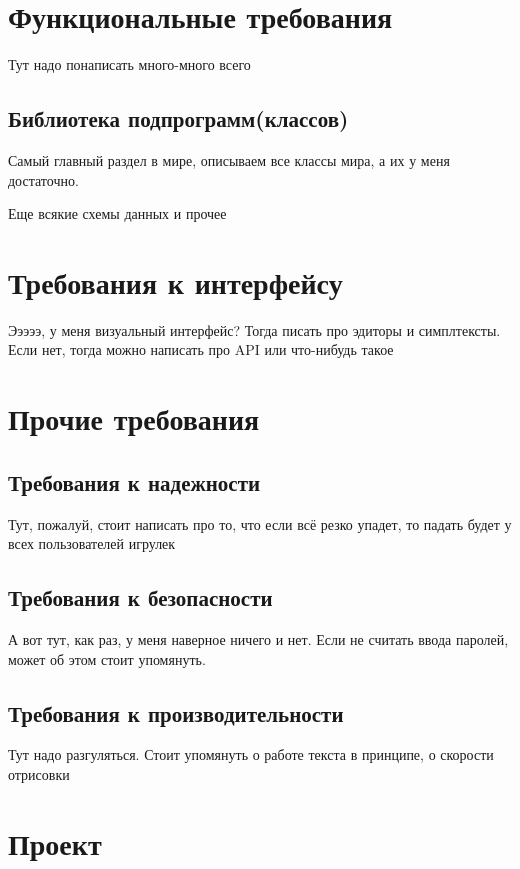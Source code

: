 \documentclass{fefu}
\begin{document}
	\section{Функциональные требования}
	\par Тут надо понаписать много-много всего
	\subsection{Библиотека подпрограмм(классов)}
	\par Самый главный раздел в мире, описываем все классы мира, а их у меня достаточно.
	\par Еще всякие схемы данных и прочее
	
	\section{Требования к интерфейсу}
	\par Эээээ, у меня визуальный интерфейс? Тогда писать про эдиторы и симплтексты. Если нет, тогда можно написать про API или что-нибудь такое
	
	\section{Прочие требования}
	\subsection{Требования к надежности}
	\par Тут, пожалуй, стоит написать про то, что если всё резко упадет, то падать будет у всех пользователей игрулек
	\subsection{Требования к безопасности}
	\par А вот тут, как раз, у меня наверное ничего и нет. Если не считать ввода паролей, может об этом стоит упомянуть.
	\subsection{Требования к производительности}
	\par Тут надо разгуляться. Стоит упомянуть о работе текста в принципе, о скорости отрисовки
	
	\section{Проект}
\end{document}
